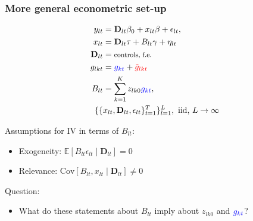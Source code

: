 \documentclass[notes,11pt, aspectratio=169]{beamer}
\begin{document}
\begin{frame}
\frametitle{More general econometric set-up}
\begin{align}
y_{lt} & =\mathbf{D}_{lt}\beta_0 +x_{lt}\beta+\epsilon_{lt}, \notag \\
x_{lt} & =\mathbf{D}_{lt}\tau+ B_{lt}\gamma+\eta_{lt}\notag \\
\mathbf{D}_{lt} &= \text{\footnotesize{controls, f.e.}} \notag \\
g_{lkt} &=   \textcolor{blue}{g_{ kt}} + \textcolor{red}{\tilde{g}_{lkt}}  \notag \\
B_{lt} &= \sum_{k=1}^K z_{lk0} \textcolor{blue}{g_{kt}}, \notag \\
\{\{  &  x_{lt},\mathbf{D}_{lt},\epsilon_{lt} \}_{t=1}^T\}_{l=1}^L, \text{ iid, } L\rightarrow \infty \notag
\end{align}



  Assumptions for IV in terms of $B_{lt}$:
  \begin{itemize}
	\setlength\itemsep{1em}
  \item Exogeneity: $\mathbb{E}\left[B_{lt}\epsilon_{lt}\middle| \mathbf{D}_{lt}\right] = 0$
  \item Relevance: $\text{Cov}\left[B_{lt}, x_{lt} \middle| \mathbf{D}_{lt}\right] \not= 0$
  \end{itemize}
  
    Question:
  \begin{itemize}
  \item What do these statements about $B_{lt}$ imply about $z_{lk0}$ and $\textcolor{blue}{g_{kt}}$?
  \end{itemize}

\end{frame}
\end{document}
